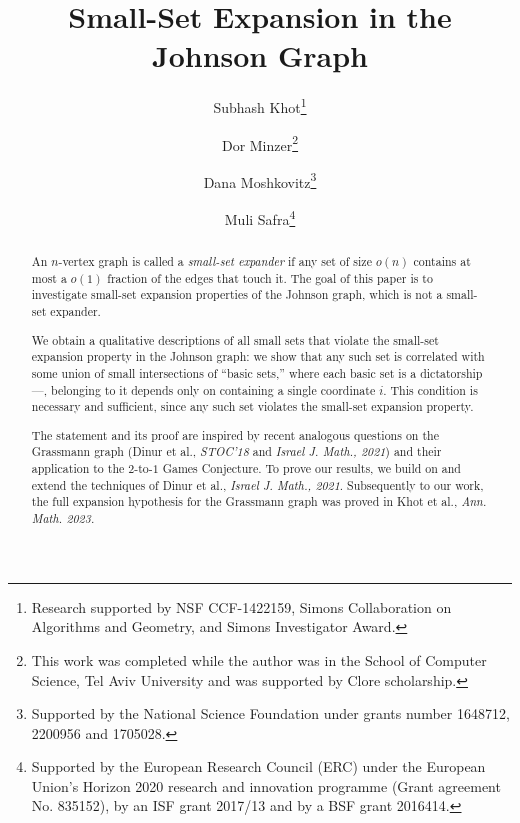 \documentclass{toc}
\begin{document}
\begin{frontmatter}%

%
%
%

%
\title{Small-Set Expansion in the\\ Johnson Graph}  %

%
%

%
%
%
%
%
%

%
%
%
%
%
%
%
%
%
%
%
%


%
%
%
%

%

\author[khot]{Subhash Khot\thanks{Research
supported by NSF CCF-1422159, Simons Collaboration on Algorithms and Geometry, and Simons Investigator Award.}}
\author[minzer]{Dor Minzer\thanks{This work was completed while the author was in the School of Computer Science, Tel Aviv University
and was supported by Clore scholarship.}}
\author[moshkovitz]{Dana Moshkovitz\thanks{Supported by the National Science Foundation under grants number 1648712, 2200956 and 1705028.}}
\author[safra]{Muli Safra\thanks{Supported by the European Research Council (ERC) under the European Union’s Horizon 2020 research and innovation programme (Grant agreement No. 835152),
by an ISF grant 2017/13 and by a BSF grant 2016414.}}

%
%
%
%

%
%
%
%
%
%
%
%
\begin{abstract}
  An $n$-vertex graph is called a \emph{small-set expander} %
%
 if any set of size $o(n)$ contains
 at most %
a $o(1)$ fraction  %
of the edges that touch it. The goal of this paper is to investigate
%
small-set  %
expansion properties of the Johnson graph, which is not a small-set expander.
%

We obtain a qualitative descriptions of all small sets that violate the small-set
expansion property in the Johnson graph: we show that any such set is correlated with
some union of small intersections
of ``basic sets,'' %
where each basic set is a dictatorship---\ie,
belonging to it depends only on
containing a single coordinate $i$.  This
%
%
condition is necessary and sufficient,  %
since any such set violates the small-set expansion property.

The statement and its proof are inspired by recent analogous questions on the
Grassmann graph %
(Dinur et al., \emph{STOC'18} and %
\emph{Israel J. Math., 2021}) %
and their application to the $2$-to-$1$
Games Conjecture. To prove our results, we
%
build on and extend  %
the techniques
of %
Dinur et al., %
\emph{Israel J. Math., 2021}. %
%
Subsequently  %
to our work, the full expansion hypothesis for the Grassmann graph %
was proved in %
Khot et al., \emph{Ann. Math. 2023.}   %
\end{abstract}


%

\end{frontmatter}
\end{document}
